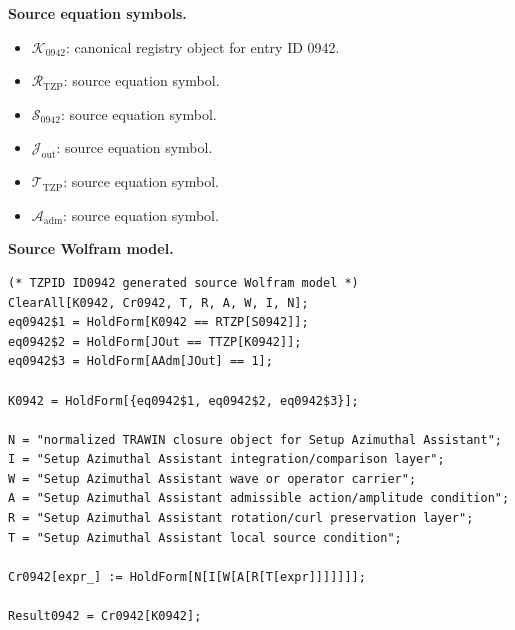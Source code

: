 \begin{minipage}[t]{0.49\linewidth}
\begingroup
\small
\raggedright
\textbf{Source equation symbols.}\par
\begin{itemize}[leftmargin=1.35em,itemsep=1pt,topsep=1pt,parsep=0pt]
    \item $\mathcal{K}_{0942}$: canonical registry object for entry ID 0942.
    \item $\mathcal{R}_{\mathrm{TZP}}$: source equation symbol.
    \item $\mathcal{S}_{0942}$: source equation symbol.
    \item $\mathcal{J}_{\mathrm{out}}$: source equation symbol.
    \item $\mathcal{T}_{\mathrm{TZP}}$: source equation symbol.
    \item $\mathcal{A}_{\mathrm{adm}}$: source equation symbol.
\end{itemize}
\endgroup
\end{minipage}\hfill
\begin{minipage}[t]{0.47\linewidth}
\begingroup
\scriptsize
\raggedright
\textbf{Source Wolfram model.}\par
\begin{Verbatim}[fontsize=\tiny,breaklines=true,breakanywhere=true]
(* TZPID ID0942 generated source Wolfram model *)
ClearAll[K0942, Cr0942, T, R, A, W, I, N];
eq0942$1 = HoldForm[K0942 == RTZP[S0942]];
eq0942$2 = HoldForm[JOut == TTZP[K0942]];
eq0942$3 = HoldForm[AAdm[JOut] == 1];

K0942 = HoldForm[{eq0942$1, eq0942$2, eq0942$3}];

N = "normalized TRAWIN closure object for Setup Azimuthal Assistant";
I = "Setup Azimuthal Assistant integration/comparison layer";
W = "Setup Azimuthal Assistant wave or operator carrier";
A = "Setup Azimuthal Assistant admissible action/amplitude condition";
R = "Setup Azimuthal Assistant rotation/curl preservation layer";
T = "Setup Azimuthal Assistant local source condition";

Cr0942[expr_] := HoldForm[N[I[W[A[R[T[expr]]]]]]];

Result0942 = Cr0942[K0942];
\end{Verbatim}
\endgroup
\end{minipage}

